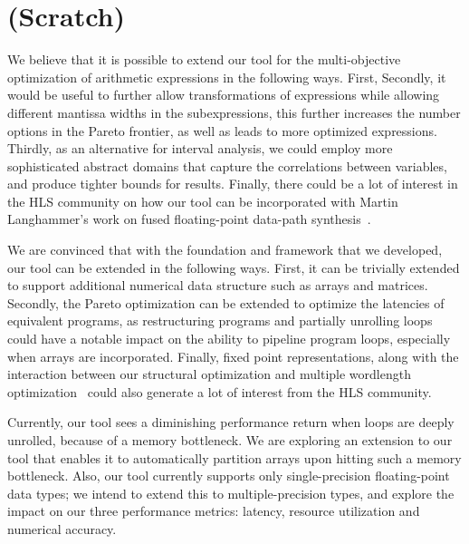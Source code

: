 \chapter{(Scratch)}

We believe that it is possible to extend our tool for the multi-objective
optimization of arithmetic expressions in the following ways. First, Secondly,
it would be useful to further allow transformations of expressions while
allowing different mantissa widths in the subexpressions, this further
increases the number options in the Pareto frontier, as well as leads to more
optimized expressions. Thirdly, as an alternative for interval analysis, we
could employ more sophisticated abstract domains that capture the correlations
between variables, and produce tighter bounds for results. Finally, there
could be a lot of interest in the HLS community on how our tool can be
incorporated with Martin Langhammer's work on fused floating-point data-path
synthesis~\cite{langhammer}.

We are convinced that with the foundation and framework that we developed,
our tool can be extended in the following ways.  First, it can be trivially
extended to support additional numerical data structure such as arrays and
matrices.  Secondly, the Pareto optimization can be extended to optimize the
latencies of equivalent programs, as restructuring programs and partially
unrolling loops could have a notable impact on the ability to pipeline
program loops, especially when arrays are incorporated.  Finally, fixed point
representations, along with the interaction between our structural optimization
and multiple wordlength optimization~\cite{constantinides} could also generate
a lot of interest from the HLS community.

Currently, our tool sees a diminishing performance return when loops are deeply
unrolled, because of a memory bottleneck. We are exploring an extension to
our tool that enables it to automatically partition arrays upon hitting such
a memory bottleneck. Also, our tool currently supports only single-precision
floating-point data types; we intend to extend this to multiple-precision
types, and explore the impact on our three performance metrics: latency,
resource utilization and numerical accuracy.


\cleardoublepage


{%
\renewcommand{\bibfont}{\normalfont\small}
\setlength{\biblabelsep}{0pt}
\setlength{\bibitemsep}{0.5\baselineskip plus 0.5\baselineskip}
\printbibliography[nottype=online]
\printbibliography[heading=subbibliography,title={Webseiten},type=online,prefixnumbers={@}]
}
\cleardoublepage

\listoffigures
\cleardoublepage

\listoftables
\cleardoublepage

% 

% 


